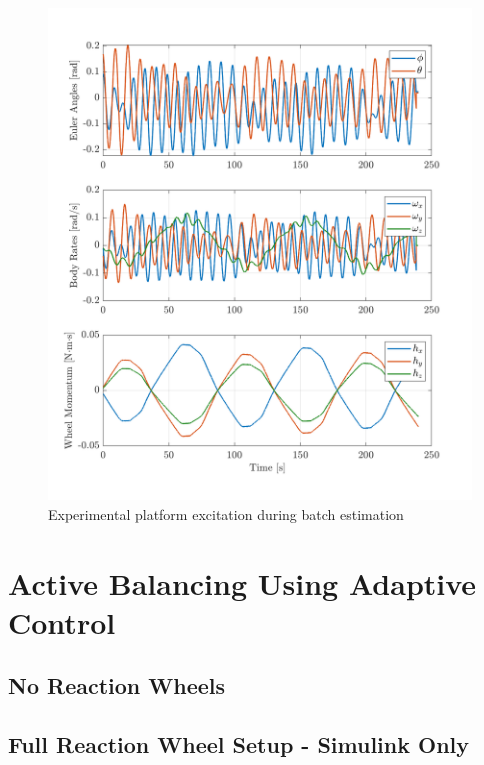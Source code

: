 \begin{figure}[ht]
    \centering
    \includegraphics[width=\linewidth]{plots/LSR_hardware_excitation}
    \caption{Experimental platform excitation during batch estimation}
\end{figure}

\section{Active Balancing Using Adaptive Control}

\subsection{No Reaction Wheels}

\subsection{Full Reaction Wheel Setup - Simulink Only}

